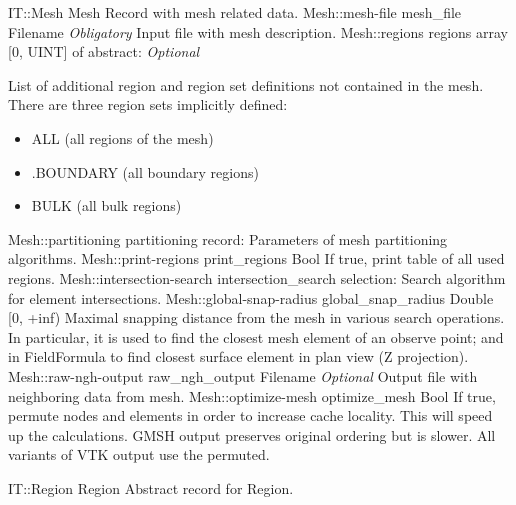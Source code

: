 \begin{RecordType}
	{IT::Mesh}
	{Mesh}
	{}%
	{}%
	{{{Record with mesh related data.}%
}}
		\RecKey
			{Mesh::mesh-file}
			{mesh{\_}file}
			{{Filename}}{}
			{ \it{Obligatory}}
			{{{Input file with mesh description.}%
}}
		\RecKey
			{Mesh::regions}
			{regions}
			{{array [0, UINT] of }{abstract: }}{}
			{ \it{Optional}}
			{{{{List of additional region and region set definitions not contained in the mesh.
There are three region sets implicitly defined:}
% 
}
\begin{itemize}
\item {ALL (all regions of the mesh)}
\item {.BOUNDARY (all boundary regions)}
\item {BULK (all bulk regions)}
\end{itemize}
}}
		\RecKey
			{Mesh::partitioning}
			{partitioning}
			{{record: }}{}
			{ }
			{{{Parameters of mesh partitioning algorithms.}%
}}
		\RecKey
			{Mesh::print-regions}
			{print{\_}regions}
			{{Bool}}{}
			{ }
			{{{If true, print table of all used regions.}%
}}
		\RecKey
			{Mesh::intersection-search}
			{intersection{\_}search}
			{{selection: }}{}
			{ }
			{{{Search algorithm for element intersections.}%
}}
		\RecKey
			{Mesh::global-snap-radius}
			{global{\_}snap{\_}radius}
			{{Double [0, +inf)}}{}
			{ }
			{{{Maximal snapping distance from the mesh in various search operations.
In particular, it is used to find the closest mesh element of an observe point; and in FieldFormula to find closest surface element in plan view (Z projection).}%
}}
		\RecKey
			{Mesh::raw-ngh-output}
			{raw{\_}ngh{\_}output}
			{{Filename}}{}
			{ \it{Optional}}
			{{{Output file with neighboring data from mesh.}%
}}
		\RecKey
			{Mesh::optimize-mesh}
			{optimize{\_}mesh}
			{{Bool}}{}
			{ }
			{{{If true, permute nodes and elements in order to increase cache locality.
This will speed up the calculations.
GMSH output preserves original ordering but is slower.
All variants of VTK output use the permuted.}%
}}
\end{RecordType}
\begin{AbstractType}
	{IT::Region}
	{Region}
	{}
	{{{Abstract record for Region.}%
}}
\end{AbstractType}

